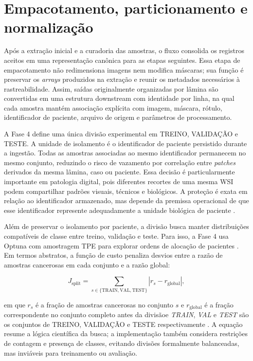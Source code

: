 \section{Empacotamento, particionamento e normalização}
\label{sec:met_particionamento_normalizacao}

Após a extração inicial e a curadoria das amostras, o fluxo consolida os
registros aceitos em uma representação canônica para as etapas seguintes. Essa
etapa de empacotamento não redimensiona imagens nem modifica máscaras; sua
função é preservar os \textit{arrays} produzidos na extração e reunir os metadados
necessários à rastreabilidade. Assim, saídas originalmente organizadas por
lâmina são convertidas em uma estrutura downstream com identidade por linha,
na qual cada amostra mantém associação explícita com imagem, máscara, rótulo,
identificador de paciente, arquivo de origem e parâmetros de processamento.

A Fase 4 define uma única divisão experimental em TREINO,
VALIDAÇÃO e TESTE. A unidade de isolamento é o identificador
de paciente persistido durante a ingestão. Todas as amostras associadas ao mesmo
identificador permanecem no mesmo conjunto, reduzindo o risco de vazamento por
correlação entre \textit{patches} derivados da mesma lâmina, caso ou paciente.
Essa decisão é particularmente importante em patologia digital, pois diferentes
recortes de uma mesma WSI podem compartilhar padrões visuais, técnicos e
biológicos. A proteção é exata em relação ao identificador armazenado, mas
depende da premissa operacional de que esse identificador represente
adequadamente a unidade biológica de paciente
\cite{roberts2017crossvalidation,dawood2026confounding}.

Além de preservar o isolamento por paciente, a divisão busca manter distribuições
compatíveis de classe entre treino, validação e teste. Para isso, a Fase 4 usa
Optuna com amostragem TPE para explorar ordens de alocação de pacientes
\cite{akiba2019optuna,bergstra2011algorithms}. Em termos abstratos, a função de
custo penaliza desvios entre a razão de amostras cancerosas em cada conjunto e a
razão global:

\begin{equation}
    J_{\mathrm{split}} =
    \sum_{s \in \{\mathrm{TRAIN},\mathrm{VAL},\mathrm{TEST}\}}
    \left| r_s - r_{\mathrm{global}} \right| ,
    \label{eq:split_objective}
\end{equation}

em que $r_s$ é a fração de amostras cancerosas no conjunto $s$ e
$r_{\mathrm{global}}$ é a fração correspondente no conjunto completo antes da
divisãoe \textit{TRAIN}, \textit{VAL} e \textit{TEST} são os conjuntos de TREINO, VALIDAÇÃO e TESTE respectivamente . A equação resume a lógica científica da busca; a implementação também
considera restrições de contagem e presença de classes, evitando divisões
formalmente balanceadas, mas inviáveis para treinamento ou avaliação.

